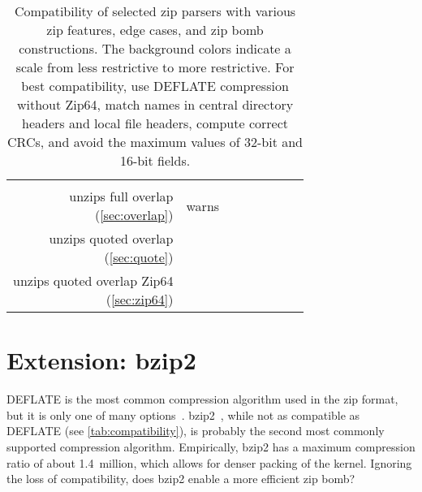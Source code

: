 \documentclass[letterpaper,twocolumn,10pt]{article}
\newcommand{\yes}{\cellcolor{ycolor}\checkmark}
\newcommand{\maybe}[1]{\cellcolor{mcolor}#1}
\newcommand{\no}{\cellcolor{ncolor}\ding{55}}
\begin{document}
\begin{table*}
\begin{tabular}{rccccccc}
\href{https://github.com/jbangert/nail/blob/4bd9cc29c4092abe7a77f8294aff2337bba02ec5/examples/zip/zip.nail#L79}{\yes} &
\href{https://android.googlesource.com/platform/system/core/+/refs/tags/android-9.0.0_r1/libziparchive/zip_archive_common.h#51}{\yes} &
\href{https://github.com/madler/sunzip/blob/master/sunzip.c#L1139}{\yes}
\\
\noalign{\vspace{0.5em}}
\thead[r]{unzips full overlap\\(\autoref{sec:overlap})} &
\maybe{warns} &
\no &
\yes &
\yes &
\yes &
\no &
\no
\\
\thead[r]{unzips quoted overlap\\(\autoref{sec:quote})} &
\yes &
\yes &
\yes &
\yes &
\yes &
\yes &
\no
\\
\thead[r]{unzips quoted overlap Zip64\\(\autoref{sec:zip64})} &
\yes &
\yes &
\yes &
\yes &
\no &
\no &
\no
\end{tabular}
\caption{
Compatibility of selected zip parsers with various zip features,
edge cases,
and zip bomb constructions.
The background colors indicate a scale from \colorbox{ycolor}{less restrictive} to \colorbox{ncolor}{more restrictive}.
For best compatibility,
use DEFLATE compression without Zip64,
match names in central directory headers and local file headers,
compute correct CRCs,
and avoid the maximum values of 32-bit and 16-bit fields.
}
\label{tab:compatibility}
\end{table*}


\section{Extension: bzip2}
\label{sec:bzip2}

DEFLATE is the most common compression algorithm
used in the zip format, but it is only one of many options~\cite[\S 4.4.5]{appnote}.
bzip2~\cite{bzip2}, while not as compatible as DEFLATE (see \autoref{tab:compatibility}),
is probably the second most commonly supported compression algorithm.
Empirically, bzip2 has a maximum compression ratio of about 1.4~million,
which allows for denser packing of the kernel.
Ignoring the loss of compatibility,
does bzip2 enable a more efficient zip bomb?

\end{document}

